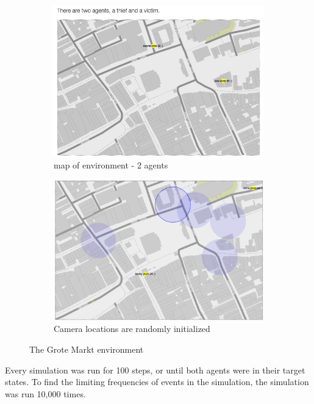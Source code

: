 \documentclass[11pt]{article}
\begin{document}
\begin{figure}[htbp]
\begin{center}
\begin{subfigure}{.5\textwidth}
\includegraphics[width=\linewidth]{images/grotemarktmap.png}
\caption{map of environment - 2 agents}
\end{subfigure}%
\begin{subfigure}{.5\textwidth}
\includegraphics[width=\linewidth]{images/agentGM.png}
\caption{Camera locations are randomly initialized}
\end{subfigure}%
\caption{The Grote Markt environment}
\label{groteMarkt}
\end{center}
\end{figure}



Every simulation was run for 100 steps, or until both agents were in their target states. To find the limiting frequencies of events in the simulation, the simulation was run 10,000 times. 
\end{document}
